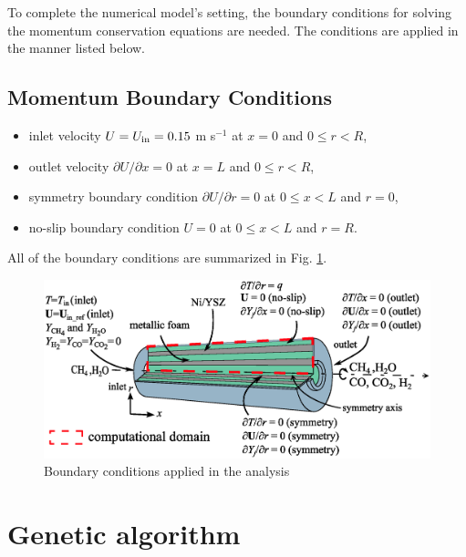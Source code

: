\documentclass[preprint,12pt]{elsarticle}
\begin{document}
To complete the numerical model's setting, the boundary conditions for solving the momentum conservation equations are needed. The conditions are applied in the manner listed below. 

\subsection*{Momentum Boundary Conditions}
\begin{itemize}
  \item inlet velocity $U = U_{\rm{in}} = 0.15$ m s$^{-1}$ \hspace*{\fill} \hfill at $x = 0$ and $0 \leq r < R$,
  \item outlet velocity $\partial U / \partial x = 0$ \hspace*{\fill} \hfill at $x = L$ and $0 \leq r < R$,
  \item symmetry boundary condition $\partial U / \partial r = 0$ \hspace*{\fill} \hfill at $0 \leq x < L$ and $r = 0$,
  \item no-slip boundary condition $U = 0$ \hspace*{\fill} \hfill at $0 \leq x < L$ and $r = R$.
\end{itemize}

All of the boundary conditions are summarized in Fig. \ref{fig:boundary}.

\begin{figure}
\centering
\includegraphics[width=120mm]{boundary.eps}
\caption{\label{fig:boundary}Boundary conditions applied in the analysis} 
\end{figure}

\section{Genetic algorithm}
\end{document}
